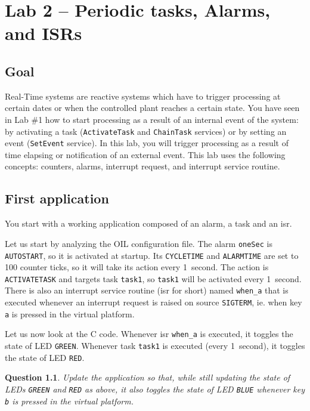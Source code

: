 \documentclass[11pt]{report}
\newtheorem{ex}{Question}
\begin{document}
\chapter{Lab 2 -- Periodic tasks, Alarms, and ISRs}

\section{Goal}

Real-Time systems are reactive systems which have to trigger processing at certain dates or when the controlled plant reaches a certain state.
You have seen in Lab \#1 how to start processing as a result of an internal event of the system: by activating a task (\texttt{ActivateTask} and \texttt{ChainTask} services) or by setting an event (\texttt{SetEvent} service).
In this lab, you will trigger processing as a result of time elapsing or notification of an external event.
This lab uses the following concepts: counters, alarms, interrupt request, and interrupt service routine.

\section{First application}

You start with a working application composed of an alarm, a task and an isr.

Let us start by analyzing the OIL configuration file.
The alarm \verb-oneSec- is \verb-AUTOSTART-, so it is activated at startup.
Its \verb-CYCLETIME- and \verb-ALARMTIME- are set to \num{100} counter ticks, so it will take its action every \SI{1}{second}.
The action is \verb-ACTIVATETASK- and targets task \verb-task1-, so \verb-task1- will be activated every \SI{1}{second}.
There is also an interrupt service routine (isr for short) named \verb-when_a- that is executed whenever an interrupt request is raised on source \verb-SIGTERM-, ie. when key \verb-a- is pressed in the virtual platform.

Let us now look at the C code.
Whenever isr \verb-when_a- is executed, it toggles the state of LED \verb-GREEN-.
Whenever task \verb-task1- is executed (every \SI{1}{second}), it toggles the state of LED \verb-RED-.

\begin{ex}
  Update the application so that, while still updating the state of LEDs \verb-GREEN- and \verb-RED- as above, it also toggles the state of LED \verb-BLUE- whenever key \verb-b- is pressed in the virtual platform.
\end{ex}
\end{document}
